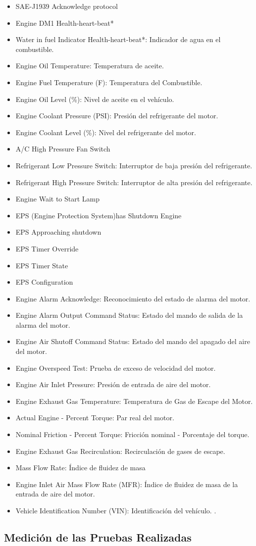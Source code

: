 \begin{itemize}
\item SAE-J1939 Acknowledge protocol
\item Engine DM1 Health-heart-beat*
\item Water in fuel Indicator Health-heart-beat*: Indicador de agua en el combustible.
\item Engine Oil Temperature: Temperatura de aceite.
\item Engine Fuel Temperature (F): Temperatura del Combustible.
\item Engine Oil Level (\%): Nivel de aceite en el vehículo.
\item Engine Coolant Pressure (PSI): Presión del refrigerante del motor.
\item Engine Coolant Level (\%): Nivel del refrigerante del motor.
\item A/C High Pressure Fan Switch
\item Refrigerant Low Pressure Switch: Interruptor de baja presión del refrigerante.
\item Refrigerant High Pressure Switch: Interruptor de alta presión del refrigerante.
\item Engine Wait to Start Lamp
\item EPS (Engine Protection System)has Shutdown Engine
\item EPS Approaching shutdown
\item EPS Timer Override
\item EPS Timer State
\item EPS Configuration
\item Engine Alarm Acknowledge: Reconocimiento del estado de alarma del motor.
\item Engine Alarm Output Command Status: Estado del mando de salida de la alarma del motor.
\item Engine Air Shutoff Command Status: Estado del mando del apagado del aire del motor.
\item Engine Overspeed Test: Prueba de exceso de velocidad del motor.
\item Engine Air Inlet Pressure: Presión de entrada de aire del motor.
\item Engine Exhaust Gas Temperature: Temperatura de Gas de Escape del Motor.
\item Actual Engine - Percent Torque: Par real del motor.
\item Nominal Friction - Percent Torque: Fricción nominal - Porcentaje del torque.
\item Engine Exhaust Gas Recirculation: Recirculación de gases de escape.
\item Mass Flow Rate:  Índice de fluidez de masa
\item Engine Inlet Air Mass Flow Rate (MFR): Índice de fluidez de masa de la entrada de aire del motor. 
\item Vehicle Identification Number (VIN): Identificación del vehículo.
  \cite{param}.

\end{itemize}
	
\subsection{Medición de las Pruebas Realizadas}
